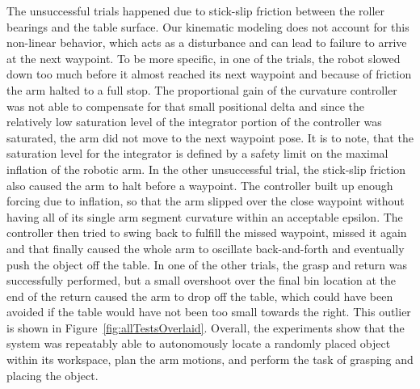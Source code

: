 The unsuccessful trials happened due to stick-slip friction between the roller bearings and the table surface.
Our kinematic modeling does not account for this non-linear behavior, which acts as a disturbance and can lead to failure to arrive at the next waypoint.
To be more specific, in one of the trials, the robot slowed down too much before it almost reached its next waypoint and because of friction the arm halted to a full stop. 
The proportional gain of the curvature controller was not able to compensate for that small positional delta and since the relatively low saturation level of the integrator portion of the controller was saturated, the arm did not move to the next waypoint pose. 
It is to note, that the saturation level for the integrator is defined by a safety limit on the maximal inflation of the robotic arm.
In the other unsuccessful trial, the stick-slip friction also caused the arm to halt before a waypoint. The controller built up enough forcing due to inflation, so that the arm slipped over the close waypoint without having all of its single arm segment curvature within an acceptable epsilon.
The controller then tried to swing back to fulfill the missed waypoint, missed it again and that finally caused the whole arm to oscillate back-and-forth and eventually push the object off the table.
In one of the other trials, the grasp and return was successfully performed, but a small overshoot over the final bin location at the end of the return caused the arm to drop off the table, which could have been avoided if the table would have not been too small towards the right.
This outlier is shown in Figure~\ref{fig:allTestsOverlaid}.
Overall, the experiments show that the system was repeatably able to autonomously locate a randomly placed object within its workspace, plan the arm motions, and perform the task of grasping and placing the object.


